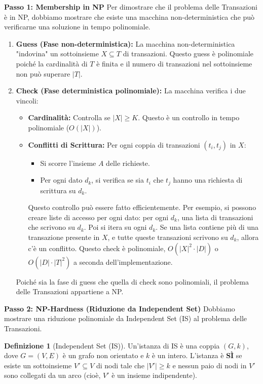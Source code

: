 \documentclass[a4paper]{article}
\theoremstyle{definition} %
\newtheorem{definition}{Definizione}
\begin{document}
\textbf{Passo 1: Membership in NP}
Per dimostrare che il problema delle Transazioni è in NP, dobbiamo mostrare che esiste una macchina non-deterministica che può verificarne una soluzione in tempo polinomiale.
\begin{enumerate}
    \item \textbf{Guess (Fase non-deterministica):} La macchina non-deterministica "indovina" un sottoinsieme $X \subseteq T$ di transazioni. Questo guess è polinomiale poiché la cardinalità di $T$ è finita e il numero di transazioni nel sottoinsieme non può superare $|T|$.
    \item \textbf{Check (Fase deterministica polinomiale):} La macchina verifica i due vincoli:
    \begin{itemize}
        \item \textbf{Cardinalità:} Controlla se $|X| \ge K$. Questo è un controllo in tempo polinomiale ($O(|X|)$).
        \item \textbf{Conflitti di Scrittura:} Per ogni coppia di transazioni $(t_i, t_j)$ in $X$:
        \begin{itemize}
            \item Si scorre l'insieme $A$ delle richieste.
            \item Per ogni dato $d_k$, si verifica se sia $t_i$ che $t_j$ hanno una richiesta di scrittura su $d_k$.
        \end{itemize}
        Questo controllo può essere fatto efficientemente. Per esempio, si possono creare liste di accesso per ogni dato: per ogni $d_k$, una lista di transazioni che scrivono su $d_k$. Poi si itera su ogni $d_k$. Se una lista contiene più di una transazione presente in $X$, e tutte queste transazioni scrivono su $d_k$, allora c'è un conflitto. Questo check è polinomiale, $O(|X|^2 \cdot |D|)$ o $O(|D| \cdot |T|^2)$ a seconda dell'implementazione.
    \end{itemize}
    Poiché sia la fase di guess che quella di check sono polinomiali, il problema delle Transazioni appartiene a NP.
\end{enumerate}

\textbf{Passo 2: NP-Hardness (Riduzione da Independent Set)}
Dobbiamo mostrare una riduzione polinomiale da Independent Set (IS) al problema delle Transazioni.
\begin{definition}[Independent Set (IS)]
Un'istanza di IS è una coppia $(G, k)$, dove $G=(V, E)$ è un grafo non orientato e $k$ è un intero. L'istanza è \textbf{SÌ} se esiste un sottoinsieme $V' \subseteq V$ di nodi tale che $|V'| \ge k$ e nessun paio di nodi in $V'$ sono collegati da un arco (cioè, $V'$ è un insieme indipendente).
\end{definition}
\end{document}
